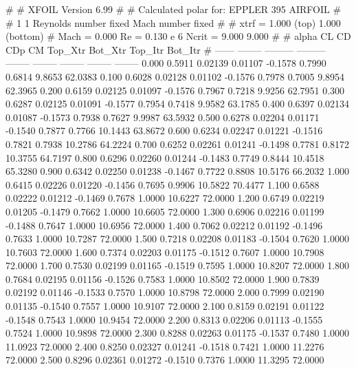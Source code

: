 #  
#       XFOIL         Version 6.99
#  
# Calculated polar for: EPPLER 395 AIRFOIL                              
#  
# 1 1 Reynolds number fixed          Mach number fixed         
#  
# xtrf =   1.000 (top)        1.000 (bottom)  
# Mach =   0.000     Re =     0.130 e 6     Ncrit =   9.000  9.000
#  
#   alpha    CL        CD       CDp       CM     Top_Xtr  Bot_Xtr  Top_Itr  Bot_Itr
#  ------ -------- --------- --------- -------- -------- -------- -------- --------
   0.000   0.5911   0.02139   0.01107  -0.1578   0.7990   0.6814   9.8653  62.0383
   0.100   0.6028   0.02128   0.01102  -0.1576   0.7978   0.7005   9.8954  62.3965
   0.200   0.6159   0.02125   0.01097  -0.1576   0.7967   0.7218   9.9256  62.7951
   0.300   0.6287   0.02125   0.01091  -0.1577   0.7954   0.7418   9.9582  63.1785
   0.400   0.6397   0.02134   0.01087  -0.1573   0.7938   0.7627   9.9987  63.5932
   0.500   0.6278   0.02204   0.01171  -0.1540   0.7877   0.7766  10.1443  63.8672
   0.600   0.6234   0.02247   0.01221  -0.1516   0.7821   0.7938  10.2786  64.2224
   0.700   0.6252   0.02261   0.01241  -0.1498   0.7781   0.8172  10.3755  64.7197
   0.800   0.6296   0.02260   0.01244  -0.1483   0.7749   0.8444  10.4518  65.3280
   0.900   0.6342   0.02250   0.01238  -0.1467   0.7722   0.8808  10.5176  66.2032
   1.000   0.6415   0.02226   0.01220  -0.1456   0.7695   0.9906  10.5822  70.4477
   1.100   0.6588   0.02222   0.01212  -0.1469   0.7678   1.0000  10.6227  72.0000
   1.200   0.6749   0.02219   0.01205  -0.1479   0.7662   1.0000  10.6605  72.0000
   1.300   0.6906   0.02216   0.01199  -0.1488   0.7647   1.0000  10.6956  72.0000
   1.400   0.7062   0.02212   0.01192  -0.1496   0.7633   1.0000  10.7287  72.0000
   1.500   0.7218   0.02208   0.01183  -0.1504   0.7620   1.0000  10.7603  72.0000
   1.600   0.7374   0.02203   0.01175  -0.1512   0.7607   1.0000  10.7908  72.0000
   1.700   0.7530   0.02199   0.01165  -0.1519   0.7595   1.0000  10.8207  72.0000
   1.800   0.7684   0.02195   0.01156  -0.1526   0.7583   1.0000  10.8502  72.0000
   1.900   0.7839   0.02192   0.01146  -0.1533   0.7570   1.0000  10.8798  72.0000
   2.000   0.7999   0.02190   0.01135  -0.1540   0.7557   1.0000  10.9107  72.0000
   2.100   0.8159   0.02191   0.01122  -0.1548   0.7543   1.0000  10.9454  72.0000
   2.200   0.8313   0.02206   0.01113  -0.1555   0.7524   1.0000  10.9898  72.0000
   2.300   0.8288   0.02263   0.01175  -0.1537   0.7480   1.0000  11.0923  72.0000
   2.400   0.8250   0.02327   0.01241  -0.1518   0.7421   1.0000  11.2276  72.0000
   2.500   0.8296   0.02361   0.01272  -0.1510   0.7376   1.0000  11.3295  72.0000
